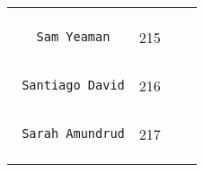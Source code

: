 \documentclass[]{article}
\begin{document}
\begin{longtable}[c]{@{}llll@{}}
\begin{minipage}[t]{0.13\columnwidth}
\end{minipage} & \begin{minipage}[t]{0.15\columnwidth}\raggedright
\end{minipage}
\\\noalign{\medskip}
\begin{minipage}[t]{0.39\columnwidth}\raggedright
\begin{verbatim}
   Sam Yeaman
\end{verbatim}
\end{minipage} & \begin{minipage}[t]{0.10\columnwidth}\raggedright
215
\end{minipage} & \begin{minipage}[t]{0.13\columnwidth}\raggedright
\end{minipage} & \begin{minipage}[t]{0.15\columnwidth}\raggedright
\end{minipage}
\\\noalign{\medskip}
\begin{minipage}[t]{0.39\columnwidth}\raggedright
\begin{verbatim}
 Santiago David
\end{verbatim}
\end{minipage} & \begin{minipage}[t]{0.10\columnwidth}\raggedright
216
\end{minipage} & \begin{minipage}[t]{0.13\columnwidth}\raggedright
\end{minipage} & \begin{minipage}[t]{0.15\columnwidth}\raggedright
\end{minipage}
\\\noalign{\medskip}
\begin{minipage}[t]{0.39\columnwidth}\raggedright
\begin{verbatim}
 Sarah Amundrud
\end{verbatim}
\end{minipage} & \begin{minipage}[t]{0.10\columnwidth}\raggedright
217
\end{minipage} & \begin{minipage}[t]{0.13\columnwidth}\raggedright
\end{minipage} & \begin{minipage}[t]{0.15\columnwidth}\raggedright
\end{minipage}
\\\noalign{\medskip}
\begin{minipage}[t]{0.39\columnwidth}\raggedright

\end{minipage}
\end{longtable}
\end{document}
